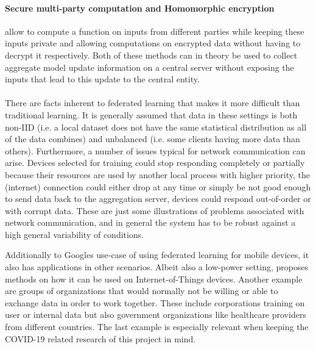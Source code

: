 \paragraph{Secure multi-party computation and Homomorphic encryption} allow to compute a function on inputs from different parties while keeping these inputs private\cite{wiki_smpc} and allowing computations on encrypted data without having to decrypt it\cite{wiki_he} respectively. Both of these methods can in theory be used to collect aggregate model update information on a central server without exposing the inputs that lead to this update to the central entity. 
\\\\
There are facts inherent to federated learning that makes it more difficult than traditional learning.
It is generally assumed that data in these settings is both non-IID (i.e. a local dataset does not have the same statistical distribution as all of the data combines) and unbalanced (i.e. some clients having more data than others). 
Furthermore, a number of issues typical for network communication can arise. Devices selected for training could stop responding completely or partially because their resources are used by another local process with higher priority, the (internet) connection could either drop at any time or simply be not good enough to send data back to the aggregation server, devices could respond out-of-order or with corrupt data. These are just some illustrations of problems associated with network communication, and in general the system has to be robust against a high general variability of conditions.

Additionally to Googles use-case of using federated learning for mobile devices, it also has applications in other scenarios. Albeit also a low-power setting, \cite{iot_fl} proposes methods on how it can be used on Internet-of-Things devices. Another example are groups of organizations that would normally not be willing or able to exchange data in order to work together. These include corporations training on user or internal data but also government organizations like healthcare providers from different countries. The last example is especially relevant when keeping the COVID-19 related research of this project in mind. 

